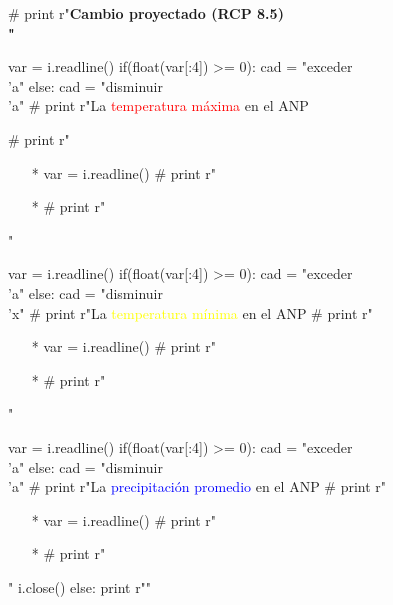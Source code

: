 \documentclass{article}
\begin{document}
\begin{python}
{		      # print r"\bf{Cambio proyectado (RCP 8.5)\\}"
		      
		      var = i.readline()
		      if(float(var[:4]) >= 0):
		         cad = "exceder\\'a"
		      else:
		         cad = "disminuir\\'a"
		      # print r"La \textcolor{red}{temperatura m\'axima} en el ANP %
		      
		      # print r"\begin{itemize}"
		      # print r"\setlength\itemsep{1em}"
		      # print r"\item[*] %
		      var = i.readline()
		      # print r"\item[*] %
		      # print r"\end{itemize}"

		      var = i.readline()
		      if(float(var[:4]) >= 0):
		         cad = "exceder\\'a"
		      else:
		         cad = "disminuir\\'x"
		      # print r"La \textcolor{yellow}{temperatura m\'inima} en el ANP %
		      # print r"\begin{itemize}"
		      # print r"\setlength\itemsep{0em}"
		      # print r"\item[*] %
		      var = i.readline()
		      # print r"\item[*] %
		      # print r"\end{itemize}"

		      var = i.readline()
		      if(float(var[:4]) >= 0):
		         cad = "exceder\\'a"
		      else:
		         cad = "disminuir\\'a"
		      # print r"La \textcolor{blue}{precipitaci\'on promedio} en el ANP %
		      # print r"\begin{itemize}"
		      # print r"\item[*] %
		      var = i.readline()
		      # print r"\item[*] %
		      # print r"\end{itemize}"
		      i.close()
		   else:
		      print r""

}
\end{python}
\end{document}
